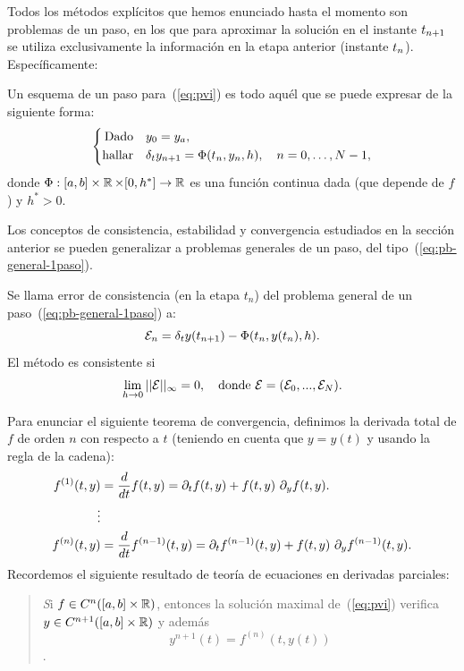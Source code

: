 Todos los métodos explícitos que hemos enunciado hasta el momento son
problemas de un paso, en los que para aproximar la solución en el
instante ${t_{n+1}}$ se utiliza exclusivamente la información en la etapa
anterior (instante ${t_n}$). Específicamente:
\begin{definition}
  Un esquema de un paso para~(\ref{eq:pvi}) es todo aquél que se puede
  expresar de la siguiente forma:
  \begin{equation}
    \label{eq:pb-general-1paso} 
    \left\{
      \begin{aligned}
        \text{Dado}\quad &y_0 = {y_a},\\
        \text{hallar}\quad &\delta_t {y_{n+1}} = \Phi({t_n},{y_n}, h), \quad
        n=0,\dots, N-1,
      \end{aligned}
    \right.
  \end{equation}
  donde $\Phi:[a,b]\times \operatorname{{\mathbb R}} \times [0,h^*] \to \operatorname{{\mathbb R}}$ es una
  función continua dada (que depende de $f$) y $h^*>0$.
\end{definition}

Los conceptos de consistencia, estabilidad y convergencia estudiados
en la sección anterior se pueden generalizar a problemas generales de
un paso, del tipo~(\ref{eq:pb-general-1paso}).

\begin{definition}
  Se llama error de consistencia (en la etapa $t_n$) del problema
  general de un paso~(\ref{eq:pb-general-1paso}) a:
  $${\cal E}_n=\delta_t y({t_{n+1}}) - \Phi({t_n},y({t_n}),h).$$
  El método es consistente si
  $$
  \lim_{h\to 0} ||{\cal E}||_\infty  = 0, \quad \text{donde } {\cal
    E}=({\cal E}_0,...,{\cal E}_N).
  $$
\end{definition}

\newcommand{\Dtotal}[2]{#2^{(#1)}}%
Para enunciar el siguiente teorema de convergencia, definimos la
derivada total de $f$ de orden $n$ con respecto a $t$ (teniendo en
cuenta que $y=y(t)$ y usando la regla de la cadena):
\begin{align*}
  \Dtotal 1 f(t,y) & = \frac{d}{dt}f(t,y) =
  \dt f(t,y) 
  + f(t,y)\ \dy f (t,y).
  \\
  \vdots
  \\
  \Dtotal n f(t,y) &= \frac{d}{dt}\Dtotal{n-1}f(t,y) =
  \dt \Dtotal {n-1} f(t,y) 
  + f(t,y) \ \dy\Dtotal {n-1}f (t,y).
\end{align*}
Recordemos el siguiente resultado de teoría de ecuaciones en derivadas
parciales:
\begin{quotation}
  \emph Si $f\in C^n([a,b]\times\operatorname{{\mathbb R}})$, entonces la solución
  maximal de~(\ref{eq:pvi}) verifica $y\in
  C^{n+1}([a,b]\times\operatorname{{\mathbb R}})$ y además $$y^{n+1}(t)=\Dtotal n f(t,
  y(t))$$.
\end{quotation}

